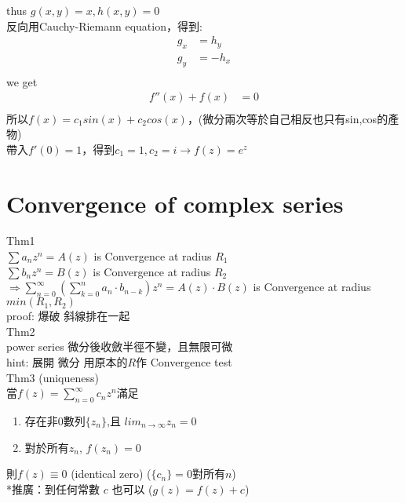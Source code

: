 \documentclass{article}
\begin{document}
thus $g(x,y)=x, h(x,y)=0$\\

反向用Cauchy-Riemann equation，得到:\\

\begin{align*}
g_{x} &= h_{y} \\
g_{y} &= -h_{x} \\
\end{align*}
we get
\begin{align*}
    f''(x) + f(x) &= 0 \\
\end{align*}
所以$f(x) = c_1sin(x) + c_2cos(x)$，(微分兩次等於自己相反也只有sin,cos的產物)\\
帶入$f'(0) = 1$，得到$c_1 = 1, c_2 = i\longrightarrow f(z) = e^{z}$\\

\section{Convergence of complex series}
Thm1\\
$\sum a_{n} z^{n}=A(z)$ is Convergence at radius $R_{1}$\\
$\sum b_{n} z^{n}=B(z)$ is Convergence at radius $R_{2}$\\
$\Rightarrow \sum_{n=0}^{\infty} (\sum_{k=0}^{n} a_{n}\cdot b_{n-k}) z^{n} =A(z) \cdot B(z)$ is Convergence at radius $min(R_{1},R_{2})$\\
proof: 爆破 斜線排在一起 \\

Thm2\\
power series 微分後收斂半徑不變，且無限可微\\
hint: 展開 微分 用原本的$R$作 Convergence test\\

Thm3 (uniqueness)\\
當$f(z)=\sum_{n=0}^{\infty} c_{n} z^{n}$滿足
\begin{enumerate}
    \item 存在非0數列$\{z_{n}\}$,且 $lim_{n \to \infty} z_{n} = 0$\\
    \item 對於所有$z_{n}$, $f(z_{n}) = 0$\\
\end{enumerate}
則$f(z) \equiv 0$ (identical zero)  ($\{c_{n}\}=0$對所有$n$)\\
*推廣：到任何常數 $c$ 也可以 ($g(z)=f(z)+c$)\\
\end{document}
